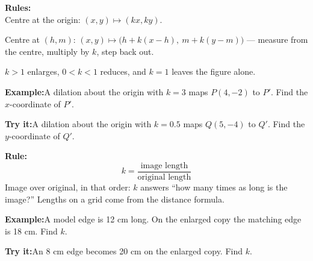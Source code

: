 \documentclass[12pt]{article}
\begin{document}

\begin{formulabox}\textbf{Rules:}\\[4pt]
Centre at the origin: $(x, y) \longmapsto (kx, ky)$.\par
Centre at $(h, m)$: $(x, y) \longmapsto \bigl(h + k(x-h),\ m + k(y-m)\bigr)$ --- measure
from the centre, multiply by $k$, step back out.\par
$k > 1$ enlarges, $0 < k < 1$ reduces, and $k = 1$ leaves the figure alone.
\end{formulabox}
\begin{examplebox}\textbf{Example:}\quad A dilation about the origin with $k = 3$ maps
$P(4, -2)$ to $P'$. Find the $x$-coordinate of $P'$.
\end{examplebox}
\begin{tryitbox}\textbf{Try it:}\quad A dilation about the origin with $k = 0.5$ maps
$Q(5, -4)$ to $Q'$. Find the $y$-coordinate of $Q'$.\\[2pt]
\end{tryitbox}

\begin{formulabox}\textbf{Rule:}\\[4pt]
\[ k = \frac{\text{image length}}{\text{original length}} \]
Image over original, in that order: $k$ answers ``how many times as long is the image?''
Lengths on a grid come from the distance formula.
\end{formulabox}
\begin{examplebox}\textbf{Example:}\quad A model edge is 12 cm long. On the enlarged
copy the matching edge is 18 cm. Find $k$.
\end{examplebox}
\begin{tryitbox}\textbf{Try it:}\quad An 8 cm edge becomes 20 cm on the enlarged copy.
Find $k$.\\[2pt]
\end{tryitbox}
\end{document}
